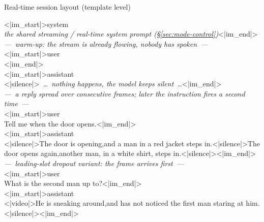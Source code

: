 \begin{promptbox}{Real-time session layout (template level)}
\ttfamily\footnotesize{}\raggedright
<|im\_start|>system\\
\textrm{\itshape the shared streaming / real-time system prompt (\S\ref{sec:mode-control})}<|im\_end|>\\
\textrm{\itshape ---~warm-up: the stream is already flowing, nobody has spoken~---}\\
<|im\_start|>user\\
<|im\_end|>\\
<|im\_start|>assistant\\
<|silence|>\allowbreak\textrm{\itshape\ \dots\ nothing happens, the model keeps silent\ \dots}\allowbreak<|im\_end|>\\
\textrm{\itshape ---~a reply spread over consecutive frames; later the instruction fires a second time~---}\\
<|im\_start|>user\\
Tell me when the door opens.<|im\_end|>\\
<|im\_start|>assistant\\
<|silence|>The door is opening,and a man in a red jacket steps in.<|silence|>The door opens again,another man, in a white shirt, steps in.<|silence|>\allowbreak<|im\_end|>\\
\textrm{\itshape ---~leading-slot dropout variant: the frame arrives first~---}\\
<|im\_start|>user\\
What is the second man up to?<|im\_end|>\\
<|im\_start|>assistant\\
<|video|>He is sneaking around,and has not noticed the first man staring at him.<|silence|><|im\_end|>
\end{promptbox}

